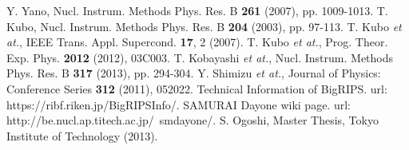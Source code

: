 \begin{thebibliography}{999}
Y. Yano, Nucl. Instrum. Methods Phys. Res. B \textbf{261} (2007), pp. 1009-1013.
T. Kubo, Nucl. Instrum. Methods Phys. Res. B \textbf{204} (2003), pp. 97-113.
T. Kubo \textit{et at.}, IEEE Trans. Appl. Supercond. \textbf{17}, 2 (2007).
T. Kubo \textit{et at.}, Prog. Theor. Exp. Phys. \textbf{2012} (2012), 03C003.
T. Kobayashi \textit{et at.}, Nucl. Instrum. Methods Phys. Res. B \textbf{317} (2013), pp. 294-304.
Y. Shimizu \textit{et at.}, Journal of Physics: Conference Series \textbf{312} (2011), 052022.
Technical Information of BigRIPS. url: https://ribf.riken.jp/BigRIPSInfo/.
SAMURAI Dayone wiki page. url: http://be.nucl.ap.titech.ac.jp/~smdayone/.
S. Ogoshi, Master Thesis, Tokyo Institute of Technology (2013).
\end{thebibliography}